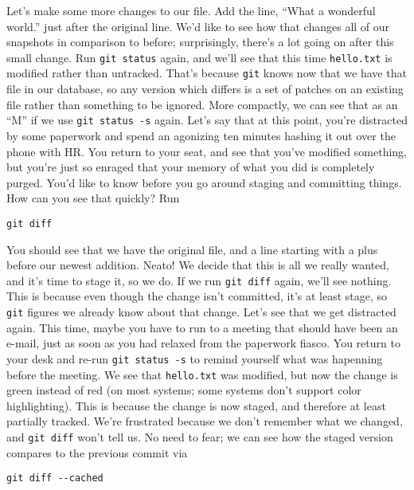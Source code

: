 \par{
Let's make some more changes to our file. Add the line, ``What a wonderful
world.'' just after the original line. We'd like to see how that changes all
of our snapshots in comparison to before; surprisingly, there's a lot going on
after this small change. Run \verb+git status+ again, and we'll see that this
time \verb+hello.txt+ is modified rather than untracked. That's because
\verb+git+ knows now that we have that file in our database, so any version
which differs is a set of patches on an existing file rather than something to
be ignored. More compactly, we can see that as an ``M'' if we use \verb+git status -s+ again. 
Let's say that at this point, you're distracted by some
paperwork and spend an agonizing ten minutes hashing it out over the phone
with HR. You return to your seat, and see that you've modified something, but
you're just so enraged that your memory of what you did is completely purged.
You'd like to know before you go around staging and committing things. How can
you see that quickly? Run
}

\begin{verbatim}
git diff
\end{verbatim}

\par{
You should see that we have the original file, and a line starting with a plus
before our newest addition. Neato! We decide that this is all we really
wanted, and it's time to stage it, so we do. If we run \verb+git diff+ again,
we'll see nothing. This is because even though the change isn't committed,
it's at least stage, so \verb+git+ figures we already know about that change.
Let's see that we get distracted again. This time, maybe you have to run to a
meeting that should have been an e-mail, just as soon as you had relaxed from
the paperwork fiasco. You return to your desk and re-run \verb+git status -s+
to remind yourself what was hapenning before the meeting. We see that
\verb+hello.txt+ was modified, but now the change is green instead of red (on
most systems; some systems don't support color highlighting). This is because
the change is now staged, and therefore at least partially tracked. We're
frustrated because we don't remember what we changed, and \verb+git diff+
won't tell us. No need to fear; we can see how the staged version compares to
the previous commit via
}

\begin{verbatim}
git diff --cached
\end{verbatim}

